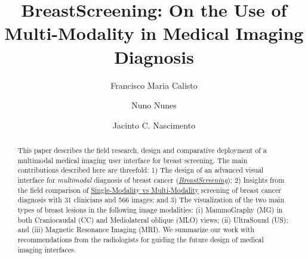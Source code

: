 \documentclass[sigconf]{acmart}
\begin{document}
\title[BreastScreening]{BreastScreening: On the Use of Multi-Modality in Medical Imaging Diagnosis}

\author{Francisco Maria Calisto}

\author{Nuno Nunes}

\author{Jacinto C. Nascimento}

\renewcommand{\shortauthors}{Calisto, et al.}

\begin{abstract}

This paper describes the field research, design and comparative deployment of a multimodal medical imaging user interface for breast screening.
The main contributions described here are threefold:
1) The design of an advanced visual interface for {\it multimodal} diagnosis of breast cancer (\hyperlink{https://breastscreening.github.io/}{{\it BreastScreening}});
2) Insights from the field comparison of \hyperlink{https://data.world/mimbcdui-project/single-modality-vs-multi-modality}{Single-Modality vs Multi-Modality} screening of breast cancer diagnosis with 31 clinicians and 566 images; and
3) The visualization of the two main types of breast lesions in the following image modalities:
(i) MammoGraphy (MG) in both 
Craniocaudal (CC) and Mediolateral oblique (MLO) views;
(ii) UltraSound (US); and
(iii) Magnetic Resonance Imaging (MRI).
We summarize our work with recommendations from the radiologists for guiding the future design of medical imaging interfaces.

\end{abstract}
\end{document}
